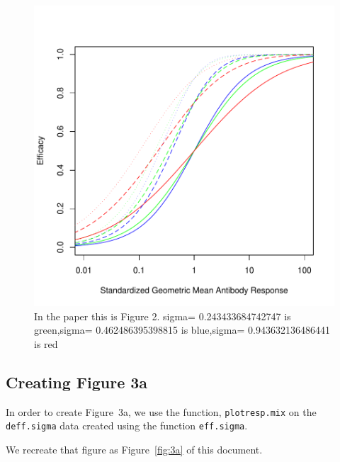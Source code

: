 \documentclass{article}[12pt]
\begin{document}
\begin{figure}
\caption{In the paper this is Figure 2.
sigma= 0.243433684742747  is  green,sigma= 0.462486395398815  is  blue,sigma= 0.943632136486441  is  red
 \label{fig:pfig2} }
\includegraphics{hbimdetails-fig2}
\end{figure}

\subsection{Creating Figure 3a}

In order to create Figure~3a, we use the function, \texttt{plotresp.mix} on the \texttt{deff.sigma} data created 
using the function \texttt{eff.sigma}. 

We recreate that figure as 
Figure~\ref{fig:3a} of this document.
\end{document}
